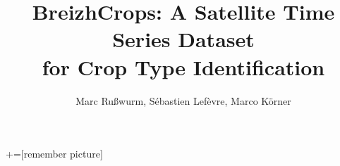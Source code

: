 \documentclass[a0]{tumposter}
\title{
	BreizhCrops: A Satellite Time Series Dataset \\ for Crop Type Identification
	}
\author{
	Marc Rußwurm\footnotemark[1],
	Sébastien Lefèvre\footnotemark[2],
	Marco Körner\footnotemark[1]
	}
\begin{document}
	+=[remember picture]
	
\maketitle


%
%
%

\end{document}
